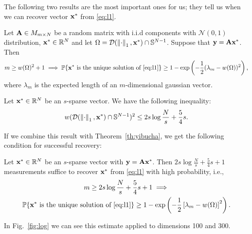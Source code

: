 The following two results are the most important ones for us; they tell us when we can recover vector $\mathbf{x}^*$ from \ref{eq:l1}.

\begin{theorem}\label{th:yibucha}
    Let $\mathbf{A} \in M_{m \times N}$ be a random matrix with i.i.d components with $\mathcal{N}(0, 1)$ distribution,
    $\mathbf{x}^* \in \mathbb{R}^N$ and let $\Omega = \mathcal{D}(\left\Vert\cdot\right\Vert_1, \mathbf{x}^*) \cap \mathbb{S}^{N-1}$.
    Suppose that $\mathbf{y} = \mathbf{A} \mathbf{x}^*$.
    Then
    \[ m \geq w(\Omega)^2 + 1 \implies \mathbb{P}\{ \mathbf{x}^* \text{ is the unique solution of \ref{eq:l1}} \} \geq
    1-\exp\left(-\frac{1}{2}(\lambda_m - w(\Omega))^2\right),\]
    where $\lambda_m$ is the expected length of an $m$-dimensional gaussian vector.
\end{theorem}

\begin{proposition}
    Let $\mathbf{x}^* \in \mathbb{R}^N$ be an $s$-sparse vector.
    We have the following inequality:
    \[ w(\mathcal{D}(\left\Vert\cdot\right\Vert_1, \mathbf{x}^*)\cap \mathbb{S}^{N-1})^2 \leq 2s \log \frac{N}{s} + \frac{5}{4}s.\]
\end{proposition}
If we combine this result with Theorem~\ref{th:yibucha}, we get the following condition for successful recovery:
\begin{corollary}\label{th:log}
    Let $\mathbf{x}^* \in \mathbb{R}^N$ be an $s$-sparse vector with $\mathbf{y} = \mathbf{A} \mathbf{x}^*$.
    Then $2s\log \frac{N}{s} + \frac{5}{4}s + 1$ measurements suffice to recover $\mathbf{x}^*$ from \ref{eq:l1} with high probability, i.e.,
    \begin{multline}
        m \geq 2s\log \frac{N}{s} + \frac{5}{4}s + 1 \implies \\
        \mathbb{P}\{\mathbf{x}^* \text{ is the unique solution of \ref{eq:l1}}\} \geq
        1 - \exp \left( - \frac{1}{2} \left[\lambda_m - w(\Omega)\right]^2 \right).
        \label{eq:log}
    \end{multline}
\end{corollary}
In Fig.~\ref{fig:log} we can see this estimate applied to dimensions 100 and 300.

